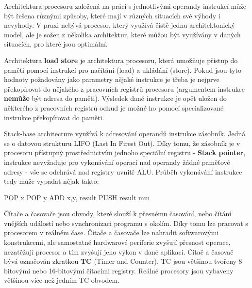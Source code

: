 
Architektura procesoru založená na práci s jednotlivými operandy instrukcí může být řešena různými způsoby, které mají v různých situacích své výhody i nevyhody. V praxi nebývá procesor, který využívá čistě jednu architektonický model, ale je sožen z několika architektur, které můžou být využívány v daných situacích, pro které jsou optimální.


Architektura {\bf load store} je architektura procesoru, která umožňuje přístup do paměti pomocí instrukcí pro načítání (load) a ukládání (store). Pokud jsou tyto hodnoty požadovány jako parametry nějaké instrukce je třeba je nejprve překopírovat do nějakého z pracovních registrů procesoru (argumentem instrukce {\bf nemůže} být adresa do paměti). Výsledek dané instrukce je opět uložen do některého z pracovních registrů odkud je možné ho pomocí specializované instrukce překopírovat do paměti.







Stack-base architecture využívá k adresování operandů instrukce zásobník. Jedná se o datovou strukturu LIFO (Last In Firest Out). Díky tomu, že zásobník je v procesoru přístupný prostřednictvím jednoho speciální registru - {\bf Stack pointer}, instrukce nevyžaduje pro vykonávání operací nad operandy žádné paměťové adresy - vše se odehrává nad registry uvnitř ALU. Průběh vykonávání instrukce tedy může vypadat nějak takto:

\vskip 4mm
{
\verbatim
\odradkovat 
POP x\odradkovat
POP y\odradkovat
ADD x,y, result\odradkovat
PUSH result\odradkovat
}
 mm



Čítače a časovače jsou obvody, které slouží k přesnému časování, nebo čítání vnějších událostí nebo synchronizaci programu s okolím. Díky tomu lze pracovat s procesorem v reálném čase. Čítače a časovače lze nahradit softwarovými konstrukcemi, ale samostatné hardwarové periferie zvyšují přesnost operace, nezatěžují procesor a tím zvyšují jeho výkon v dané aplikaci. Čítač a časovač bývá označován zkratkou {\bf TC} (Timer and Counter). TC jsou většinou tvořeny 8-bitovými nebo 16-bitovými čítacími registry. Reálné procesory jsou vybaveny většinou více než jedním TC obvodem.

